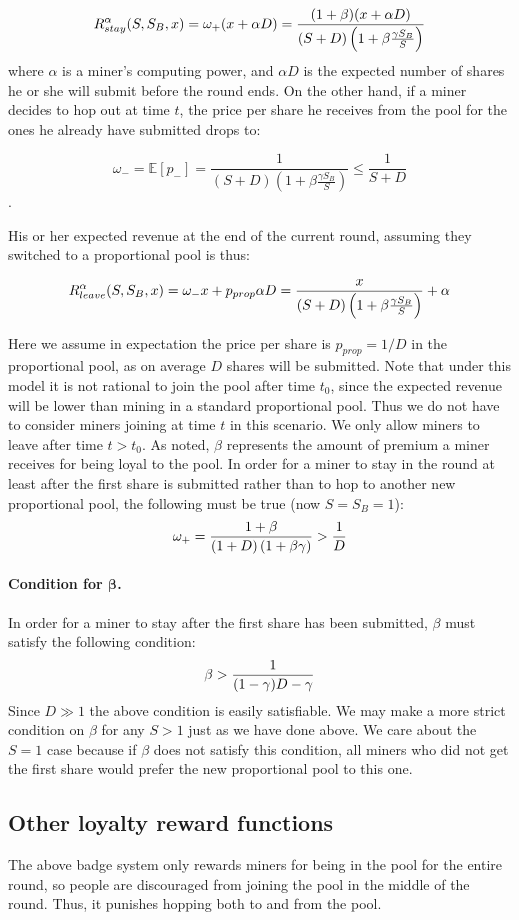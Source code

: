 \documentclass{article}
\theoremstyle{plain}
\theoremstyle{definition}
\begin{document}
\[ R_{stay}^{\alpha}(S, S_B, x) = \omega_{+} (x + \alpha D)  = 
{(1 + \beta)(x + \alpha D) \over (S + D)\left(1 + \beta {\gamma S_B \over S}\right)} \] 
where $\alpha$ is a miner's computing power, and $\alpha D$ is the expected
number of shares he or she will submit before the round ends.
On the other hand, if a miner decides to hop out at time $t$,
the price per share he receives from the pool for the ones he already 
have submitted drops to:

\[\omega_{-} =  \mathbb{E}[p_{-}] = \frac{1}{(S + D)\left(1 + \beta \frac{\gamma S_B}{S}\right)} \le \frac{1}{S + D}\]. 
      
His or her expected revenue at the end of the current round, 
assuming they switched to a proportional pool is thus:

\[R_{leave}^{\alpha}(S, S_B, x) = \omega_{-}x + p_{prop} \alpha D =  
{x \over (S + D)\left(1 + \beta {\gamma S_B \over S}\right)} + \alpha\]

Here we assume in expectation the price per share is $p_{prop} = 1/D$
in the proportional pool, as on average $D$ shares will be submitted.
Note that under this model it is not rational to join the pool after time
$t_0$, since the expected revenue will be lower than mining in a standard 
proportional pool. Thus we do not have to consider miners joining at time $t$ 
in this scenario. We only allow miners to leave after time $t > t_0$.
As noted, $\beta$ represents the amount of premium a miner receives
for being loyal to the pool. In order for a miner to stay in the round
at least after the first share is submitted rather than to hop to another 
new proportional pool, the following must be true
(now $S = S_B = 1$):
\[
\omega_{+} = \frac{1 + \beta}{(1 + D)\left(1 + \beta \gamma \right)} 
> {1 \over D}
\]

\paragraph{Condition for $\bm{\beta}$.} In order for a miner to stay after the
first share has been submitted, $\beta$ must satisfy the following condition:
\[
\beta > {1 \over (1 - \gamma)D -\gamma}
\]
Since $D \gg 1$ the above condition is easily satisfiable. We may make a more strict condition on $\beta$ for any $S > 1$ just as we have done above. We care about the $S=1$ case because if $\beta$ does not satisfy this condition, all miners who did not get the first share would prefer the new proportional pool to this one.

\subsection{Other loyalty reward functions}
The above badge system only rewards miners for being in the pool for the entire round, so people are discouraged from joining the pool in the middle of the round. Thus, it punishes hopping both to and from the pool. 
\end{document}
